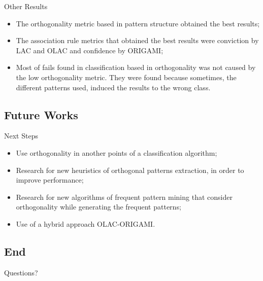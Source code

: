 \begin{frame}{Other Results}
	\begin{itemize}[<+-| alert@+>]
		\item The orthogonality metric based in pattern structure obtained the best results;
		\item The association rule metrics that obtained the best results were conviction by LAC and OLAC and confidence by ORIGAMI;
		\item Most of fails found in classification based in orthogonality was not caused by the low orthogonality metric. They were found because sometimes, the different patterns used, induced the results to the wrong class.
	\end{itemize}
\end{frame}

\subsection{Future Works}

\begin{frame}{Next Steps}
	\begin{itemize}[<+-| alert@+>]
		\item Use orthogonality in another points of a classification algorithm;
		\item Research for new heuristics of orthogonal patterns extraction, in order to improve performance;
		\item Research for new algorithms of frequent pattern mining that consider  orthogonality while generating the frequent patterns;
		\item Use of a hybrid approach OLAC-ORIGAMI.
	\end{itemize}
\end{frame}

\subsection{End}
\begin{frame}[c]
\begin{center}
\Large
\alert {Questions?}
\Large
\end{center}
\end{frame}
